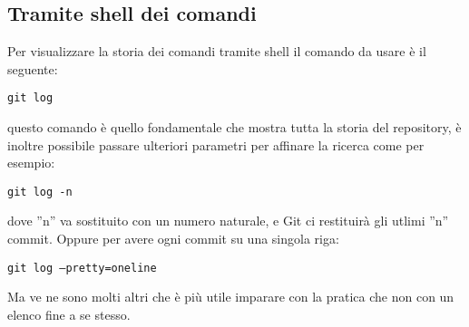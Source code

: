 \subsection{Tramite shell dei comandi}
Per visualizzare la storia dei comandi tramite shell il comando da usare è il seguente:

\begin{center}
\texttt{git log}
\end{center}

questo comando è quello fondamentale che mostra tutta la storia del repository, è inoltre possibile passare ulteriori parametri per affinare la ricerca come per esempio:

\begin{center}
\texttt{git log -n}
\end{center}

dove ''n'' va sostituito con un numero naturale, e Git ci restituirà gli utlimi ''n'' commit. Oppure per avere ogni commit su una singola riga:

\begin{center}
\texttt{git log --pretty=oneline}
\end{center}

Ma ve ne sono molti altri che è più utile imparare con la pratica che non con un elenco fine a se stesso.